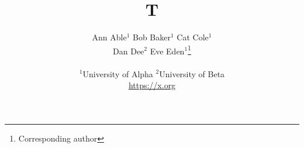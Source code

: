 \documentclass{article}
\begin{document}
\title{T}
\author{
\parbox{\linewidth}{
	\centering
	Ann Able$^{1}$ %
	\quad Bob Baker$^{1}$ %
	\quad Cat Cole$^{1}$ \\
	Dan Dee$^{2}$ 
	\quad Eve Eden$^{1}$\thanks{Corresponding author} %
}
\vspace{8pt}\\
$^{1}$University of Alpha \qquad 
$^{2}$University of Beta
\vspace{8pt}\\
\href{https://x.org/}{https://x.org}
}
\maketitle
\end{document}
